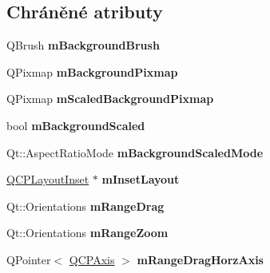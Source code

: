 \subsection*{Chráněné atributy}
\begin{DoxyCompactItemize}
\item 
\hypertarget{classQCPAxisRect_a5748e1a37f63c428e38b0a7724b46259}{}Q\+Brush {\bfseries m\+Background\+Brush}\label{classQCPAxisRect_a5748e1a37f63c428e38b0a7724b46259}

\item 
\hypertarget{classQCPAxisRect_a38fb1a15f43228a0c124553649303722}{}Q\+Pixmap {\bfseries m\+Background\+Pixmap}\label{classQCPAxisRect_a38fb1a15f43228a0c124553649303722}

\item 
\hypertarget{classQCPAxisRect_aa74b9415598d59b49290e41e42d7ee27}{}Q\+Pixmap {\bfseries m\+Scaled\+Background\+Pixmap}\label{classQCPAxisRect_aa74b9415598d59b49290e41e42d7ee27}

\item 
\hypertarget{classQCPAxisRect_a5ad835f0fae5d7cc5ada9e063641dbf1}{}bool {\bfseries m\+Background\+Scaled}\label{classQCPAxisRect_a5ad835f0fae5d7cc5ada9e063641dbf1}

\item 
\hypertarget{classQCPAxisRect_a859fd368e794663e346b4f53f35078e9}{}Qt\+::\+Aspect\+Ratio\+Mode {\bfseries m\+Background\+Scaled\+Mode}\label{classQCPAxisRect_a859fd368e794663e346b4f53f35078e9}

\item 
\hypertarget{classQCPAxisRect_a255240399e0fd24baad80cbbe46f698a}{}\hyperlink{classQCPLayoutInset}{Q\+C\+P\+Layout\+Inset} $\ast$ {\bfseries m\+Inset\+Layout}\label{classQCPAxisRect_a255240399e0fd24baad80cbbe46f698a}

\item 
\hypertarget{classQCPAxisRect_aa9f107f66ca3469ad50ee6cea7c9e237}{}Qt\+::\+Orientations {\bfseries m\+Range\+Drag}\label{classQCPAxisRect_aa9f107f66ca3469ad50ee6cea7c9e237}

\item 
\hypertarget{classQCPAxisRect_a215eff671d48df2edccc36e7f976f28c}{}Qt\+::\+Orientations {\bfseries m\+Range\+Zoom}\label{classQCPAxisRect_a215eff671d48df2edccc36e7f976f28c}

\item 
\hypertarget{classQCPAxisRect_aeaaa38c6d2030dd5f84461e2596e41e3}{}Q\+Pointer$<$ \hyperlink{classQCPAxis}{Q\+C\+P\+Axis} $>$ {\bfseries m\+Range\+Drag\+Horz\+Axis}\label{classQCPAxisRect_aeaaa38c6d2030dd5f84461e2596e41e3}


\end{DoxyCompactItemize}
